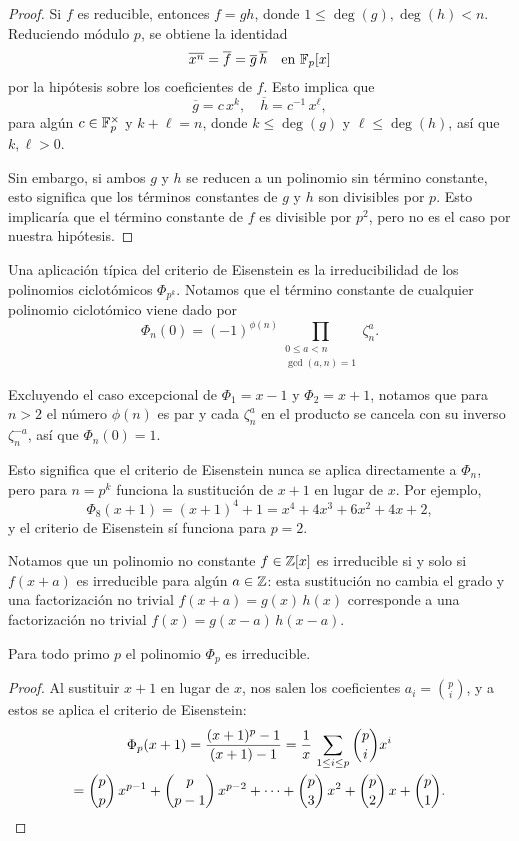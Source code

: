 \begin{proof}
  Si $f$ es reducible, entonces $f = gh$, donde $1 \le \deg (g), \deg (h) < n$.
  Reduciendo módulo $p$, se obtiene la identidad
  \[ \overline{x^n} = \overline{f} =
     \overline{g}\,\overline{h}\quad\text{en }\mathbb{F}_p [x] \]
  por la hipótesis sobre los coeficientes de $f$. Esto implica que
  $$\overline{g} = c\,x^k, \quad \overline{h} = c^{-1}\,x^\ell,$$
  para algún $c\in \mathbb{F}_p^\times$ y $k + \ell = n$, donde $k \le \deg (g)$ y $\ell
  \le \deg (h)$, así que $k,\ell > 0$.

  Sin embargo, si ambos $g$ y $h$ se reducen a un polinomio sin término
  constante, esto significa que los términos constantes de $g$ y $h$ son
  divisibles por $p$. Esto implicaría que el término constante de $f$ es
  divisible por $p^2$, pero no es el caso por nuestra hipótesis.
\end{proof}

Una aplicación típica del criterio de Eisenstein es la irreducibilidad de los
polinomios ciclotómicos $\Phi_{p^k}$. Notamos que el término constante de
cualquier polinomio ciclotómico viene dado por
\[ \Phi_n (0) =
   (-1)^{\phi (n)} \prod_{\substack{0 \le a < n \\ \gcd (a,n) = 1}} \zeta_n^a. \]

Excluyendo el caso excepcional de $\Phi_1 = x-1$ y $\Phi_2 = x+1$, notamos que
para $n > 2$ el número $\phi (n)$ es par y cada $\zeta_n^a$ en el producto se
cancela con su inverso $\zeta_n^{-a}$, así que $\Phi_n (0) = 1$.

Esto significa que el criterio de Eisenstein nunca se aplica directamente a
$\Phi_n$, pero para $n = p^k$ funciona la sustitución de $x+1$ en lugar de
$x$. Por ejemplo,
$$\Phi_8 (x+1) = (x+1)^4 + 1 = x^4 + 4x^3 + 6x^2 + 4x + 2,$$
y el criterio de Eisenstein sí funciona para $p = 2$.

Notamos que un polinomio no constante $f \in \mathbb{Z} [x]$ es irreducible si y solo
si $f (x + a)$ es irreducible para algún $a \in \mathbb{Z}$: esta sustitución no cambia
el grado y una factorización no trivial $f (x + a) = g (x)\,h(x)$ corresponde a
una factorización no trivial $f (x) = g (x-a)\,h (x-a)$.

\begin{proposicion}
  Para todo primo $p$ el polinomio $\Phi_p$ es irreducible.

  \begin{proof}
    Al sustituir $x+1$ en lugar de $x$, nos salen los coeficientes
    $a_i = {p\choose i}$, y a estos se aplica el criterio de Eisenstein:
    \begin{multline*}
      \Phi_p (x+1) = \frac{(x+1)^p - 1}{(x+1) - 1} = \frac{1}{x}\,\sum_{1 \le i \le p} {p\choose i} x^i \\
      = {p\choose p}\,x^{p-1} + {p\choose p-1}\,x^{p-2} + \cdots + {p\choose 3}\,x^2 + {p\choose 2}\,x + {p \choose 1}. \qedhere
    \end{multline*}
  \end{proof}
\end{proposicion}

